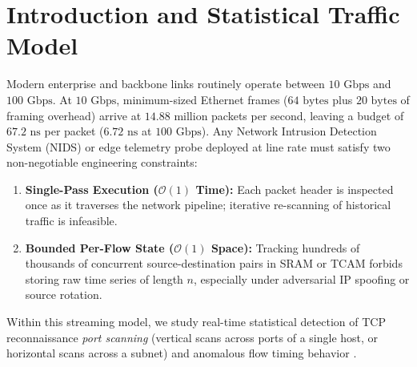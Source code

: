 \documentclass[oneside,noexaminfo,english]{sapthesis}
\numberwithin{equation}{section}
\numberwithin{figure}{section}
\numberwithin{table}{section}
\theoremstyle{compactplain}
\theoremstyle{compactdef}
\theoremstyle{compactrem}
\begin{document}
\tableofcontents

\mainmatter
{}
\setlength{\headwidth}{\textwidth}
\pagestyle{plain}
\setlength{\abovedisplayskip}{5pt plus 2pt minus 2pt}
\setlength{\belowdisplayskip}{5pt plus 2pt minus 2pt}
\setlength{\abovedisplayshortskip}{3pt plus 1pt minus 1pt}
\setlength{\belowdisplayshortskip}{3pt plus 1pt minus 1pt}
\setlength{\textfloatsep}{8pt plus 2pt minus 2pt}
\setlength{\intextsep}{8pt plus 2pt minus 2pt}

\section{Introduction and Statistical Traffic Model}
\label{sec:intro}

Modern enterprise and backbone links routinely operate between $10\text{ Gbps}$ and $100\text{ Gbps}$. At $10\text{ Gbps}$, minimum-sized Ethernet frames ($64\text{ bytes}$ plus $20\text{ bytes}$ of framing overhead) arrive at $14.88\text{ million}$ packets per second, leaving a budget of $67.2\text{ ns}$ per packet ($6.72\text{ ns}$ at $100\text{ Gbps}$). Any Network Intrusion Detection System (NIDS) or edge telemetry probe deployed at line rate must satisfy two non-negotiable engineering constraints:
\begin{enumerate}[label=(\roman*)]
    \item \textbf{Single-Pass Execution ($\mathcal{O}(1)$ Time):} Each packet header is inspected once as it traverses the network pipeline; iterative re-scanning of historical traffic is infeasible.
    \item \textbf{Bounded Per-Flow State ($\mathcal{O}(1)$ Space):} Tracking hundreds of thousands of concurrent source-destination pairs in SRAM or TCAM forbids storing raw time series of length $n$, especially under adversarial IP spoofing or source rotation.
\end{enumerate}

Within this streaming model, we study real-time statistical detection of TCP reconnaissance \emph{port scanning} (vertical scans across ports of a single host, or horizontal scans across a subnet) and anomalous flow timing behavior \cite{jung2004}.
\end{document}
